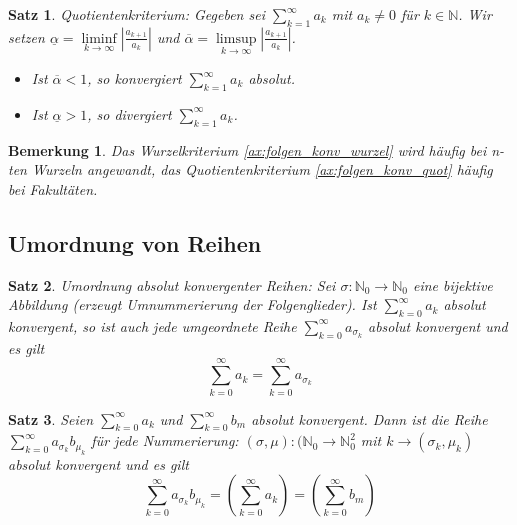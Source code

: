 \documentclass[12pt,a4paper]{article}%
\newtheorem{satz}{Satz}[section]
\newtheorem{bem}{Bemerkung}[section]
\numberwithin{equation}{section}
\newcommand{\N}{\mathbb{N}}
\numberwithin{equation}{subsection}
\begin{document}
	  \begin{satz}
	    Quotientenkriterium: Gegeben sei $\sum\limits_{k=1}^\infty a_k$ mit $a_k \neq 0$ für $k \in \N$. Wir setzen $\underline{\alpha} = \liminf\limits_{k \rightarrow \infty} \left| \frac{a_{k+1}}{a_k}\right|$ und $\overline{\alpha} = \limsup\limits_{k \rightarrow \infty} \left| \frac{a_{k+1}}{a_k}\right|$.
	    \begin{itemize}
	      \item[a) ] Ist $\overline{\alpha} < 1$, so konvergiert $\sum\limits_{k=1}^\infty a_k$ absolut.
	      \item[b) ] Ist $\underline{\alpha} > 1$, so divergiert $\sum\limits_{k=1}^\infty a_k$.
	    \end{itemize}\label{ax:folgen_konv_quot}
	  \end{satz}
    \begin{bem}
      Das Wurzelkriterium \eqref{ax:folgen_konv_wurzel} wird häufig bei n-ten Wurzeln angewandt, das Quotientenkriterium \eqref{ax:folgen_konv_quot} häufig bei Fakultäten.
    \end{bem}
  \subsection{Umordnung von Reihen}
  \begin{satz}
    Umordnung absolut konvergenter Reihen: Sei $\sigma: \N_0 \rightarrow \N_0$ eine bijektive Abbildung (erzeugt Umnummerierung der Folgenglieder). Ist $\sum\limits_{k=0}^\infty a_k$ absolut konvergent, so ist auch jede umgeordnete Reihe $\sum\limits_{k=0}^\infty a_{\sigma_k}$ absolut konvergent und es gilt
    \begin{equation}
      \sum\limits_{k=0}^\infty a_k = \sum\limits_{k=0}^\infty a_{\sigma_k}
    \end{equation}
  \end{satz}
  \begin{satz}
    Seien $\sum\limits_{k=0}^\infty a_k$ und $\sum\limits_{k=0}^\infty b_m$ absolut konvergent. Dann ist die Reihe $\sum\limits_{k=0}^\infty a_{\sigma_k} b_{\mu_k}$ für jede Nummerierung: $(\sigma,\mu):(\N_0 \rightarrow \N_0^2$ mit $k \rightarrow (\sigma_k, \mu_k)$ absolut konvergent und es gilt
    \begin{equation}
      \sum\limits_{k=0}^\infty a_{\sigma_k} b_{\mu_k} = \left(\sum\limits_{k=0}^\infty a_k \right) =  \left(\sum\limits_{k=0}^\infty b_m \right)
    \end{equation}
  \end{satz}
  
\end{document}
